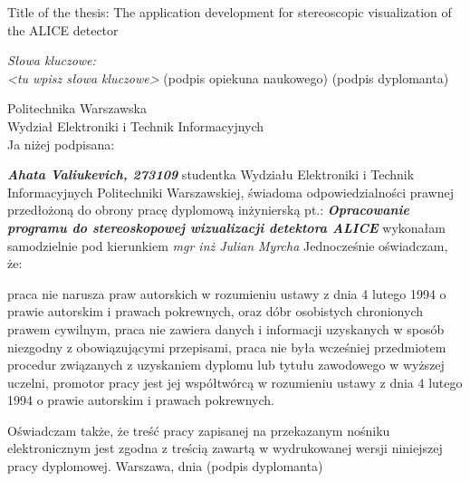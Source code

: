 \newpage
\thispagestyle{empty}
\phantom{Nothing here}
\newpage
\clearpage
\phantom{Here neither}

\setcounter{page}{5}
\vspace{-1.5cm}
\begin{flushleft}
	Title of the thesis: The application development for stereoscopic visualization of the ALICE detector
\end{flushleft}
\vspace{0.5cm}
\vspace{0.5cm}
\noindent \textit{Słowa kluczowe: \\ <tu wpisz słowa kluczowe>} 
\vfill
(podpis opiekuna naukowego) \hfill (podpis dyplomanta)

\newpage
\thispagestyle{empty}
\phantom{Nothing here}
\newpage
\clearpage
\phantom{Here neither}

\setcounter{page}{7}
\vspace{-1.5cm}
\begin{flushleft}
	Politechnika Warszawska \\ 
	Wydział Elektroniki i Technik Informacyjnych \\
	\vspace{0.5cm}
	Ja niżej podpisana: 
\end{flushleft}
\center \textit{\textbf{Ahata Valiukevich, 273109}} 
\justify studentka Wydziału Elektroniki i Technik Informacyjnych Politechniki Warszawskiej, świadoma odpowiedzialności prawnej przedłożoną do obrony pracę dyplomową inżynierską pt.:
\center \textit{\textbf{Opracowanie programu do stereoskopowej wizualizacji detektora ALICE}} 
\justify wykonałam samodzielnie pod kierunkiem
\center \textit{mgr inż Julian Myrcha} 
\justify Jednocześnie oświadczam, że: \\
\begin{itemize}
	\itemi praca nie narusza praw autorskich w rozumieniu ustawy z dnia 4 lutego 1994 o prawie autorskim i prawach pokrewnych, oraz dóbr osobistych chronionych prawem cywilnym,
	\itemi praca nie zawiera danych i informacji uzyskanych w sposób niezgodny z obowiązującymi przepisami,
	\itemi praca nie była wcześniej przedmiotem procedur związanych z uzyskaniem dyplomu lub tytułu zawodowego w wyższej uczelni,
	\itemi promotor pracy jest jej współtwórcą w rozumieniu ustawy z dnia 4 lutego 1994 o prawie autorskim i prawach pokrewnych.
\end{itemize}
\justify Oświadczam także, że treść pracy zapisanej na przekazanym nośniku elektronicznym jest zgodna z treścią zawartą w wydrukowanej wersji niniejszej pracy dyplomowej.
\vfill
Warszawa, dnia  \hfill (podpis dyplomanta) 

